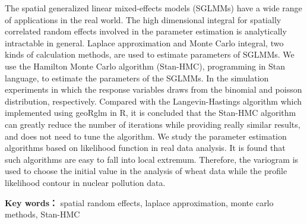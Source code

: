 The spatial generalized linear mixed-effects models (SGLMMs) have a wide range of applications in the real world. The high dimensional integral for spatially correlated random effects involved in the parameter estimation is analytically intractable in general. Laplace approximation and Monte Carlo integral, two kinds of calculation methods, are used to estimate parameters of SGLMMs. We use the Hamilton Monte Carlo algorithm (Stan-HMC), programming in Stan language, to estimate the parameters of the SGLMMs. In the simulation experiments in which the response variables draws from the binomial and poisson distribution, respectively. Compared with the Langevin-Hastings algorithm which implemented using geoRglm in R, it is concluded that the Stan-HMC algorithm can greatly reduce the number of iterations while providing really similar results, and does not need to tune the algorithm. We study the parameter estimation algorithms based on likelihood function in real data analysis. It is found that such algorithms are easy to fall into local extremum. Therefore, the variogram is used to choose the initial value in the analysis of wheat data while the profile likelihood contour in nuclear pollution data.

%  

\medskip
\par

{\bf Key words：} spatial random effects, laplace approximation, monte carlo methods, Stan-HMC

\newpage 
\mbox{} 

